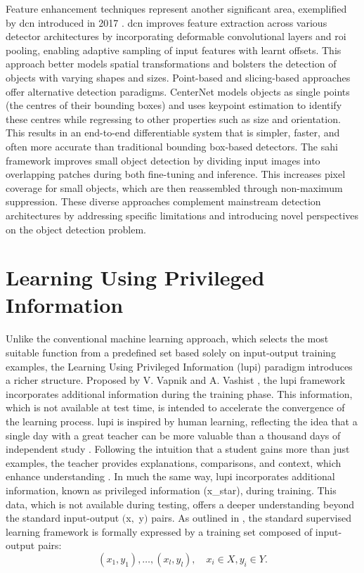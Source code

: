 Feature enhancement techniques represent another significant area, exemplified by \gls{dcn} introduced in 2017 \cite{dcn}. \gls{dcn} improves feature extraction across various detector architectures by incorporating deformable convolutional layers and \gls{roi} pooling, enabling adaptive sampling of input features with learnt offsets. This approach better models spatial transformations and bolsters the detection of objects with varying shapes and sizes.
Point-based and slicing-based approaches offer alternative detection paradigms. CenterNet \cite{centernet} models objects as single points (the centres of their bounding boxes) and uses keypoint estimation to identify these centres while regressing to other properties such as size and orientation. This results in an end-to-end differentiable system that is simpler, faster, and often more accurate than traditional bounding box-based detectors. The \gls{sahi} framework \cite{sahi_detection} improves small object detection by dividing input images into overlapping patches during both fine-tuning and inference. This increases pixel coverage for small objects, which are then reassembled through non-maximum suppression.
These diverse approaches complement mainstream detection architectures by addressing specific limitations and introducing novel perspectives on the object detection problem.


\section{Learning Using Privileged Information}
\label{subsec:2_lupi_background}

Unlike the conventional machine learning approach, which selects the most suitable function from a predefined set based solely on input-output training examples, the Learning Using Privileged Information (\gls{lupi}) paradigm introduces a richer structure. Proposed by V. Vapnik and A. Vashist \cite{lupi, Vapnik2015LearningUP}, the \gls{lupi} framework incorporates additional information during the training phase. This information, which is not available at test time, is intended to accelerate the convergence of the learning process.
\gls{lupi} is inspired by human learning, reflecting the idea that a single day with a great teacher can be more valuable than a thousand days of independent study \cite{lupi_distillation, lupi}. Following the intuition that a student gains more than just examples, the teacher provides explanations, comparisons, and context, which enhance understanding \cite{lupi, lupi_distillation, lupi_nips}.
In much the same way, \gls{lupi} incorporates additional information, known as privileged information (\gls{x_star}), during training. This data, which is not available during testing, offers a deeper understanding beyond the standard input-output $($\gls{x}$ ,$ \gls{y}$)$ pairs. 
As outlined in \cite{lupi}, the standard supervised learning framework is formally expressed by a training set composed of input-output pairs:
\begin{equation} \label{eq:supervised_learning}
(x_1, y_1), \dots, (x_l, y_l), \quad x_i \in X, y_i \in Y  .
\end{equation}

